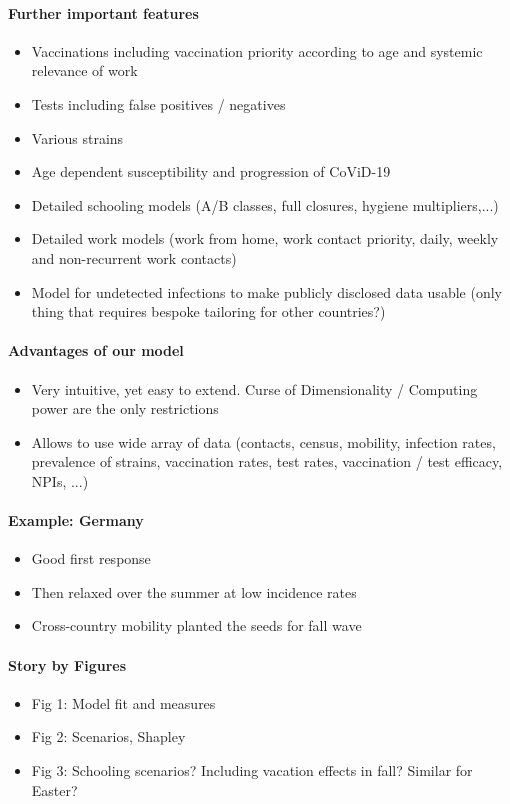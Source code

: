 \paragraph{Further important features }
\begin{itemize}
    \item Vaccinations including vaccination priority according to age and systemic relevance of work
    \item Tests including false positives / negatives
    \item Various strains
    \item Age dependent susceptibility and progression of CoViD-19
    \item Detailed schooling models (A/B classes, full closures, hygiene multipliers,...)
    \item Detailed work models (work from home, work contact priority, daily, weekly and non-recurrent work contacts)
    \item Model for undetected infections to make publicly disclosed data usable (only thing that requires bespoke tailoring for other countries?)
\end{itemize}

\paragraph{Advantages of our model}
\begin{itemize}
    \item Very intuitive, yet easy to extend. Curse of Dimensionality / Computing power are the only restrictions
    \item Allows to use wide array of data (contacts, census, mobility, infection rates, prevalence of strains, vaccination rates, test rates, vaccination / test efficacy, NPIs, ...)
\end{itemize}    

\paragraph{Example: Germany}
\begin{itemize}
    \item Good first response
    \item Then relaxed over the summer at low incidence rates
    \item Cross-country mobility planted the seeds for fall wave
\end{itemize}

\paragraph{Story by Figures}
\begin{itemize}
    \item Fig 1: Model fit and measures
    \item Fig 2: Scenarios, Shapley
    \item Fig 3: Schooling scenarios? Including vacation effects in fall? Similar for Easter?
\end{itemize}

